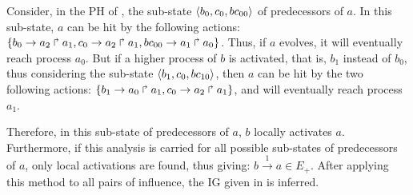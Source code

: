\begin{example*}
Consider, in the PH of , the sub-state $\langle b_0, c_0, bc_{00} \rangle$ of predecessors of $a$.
In this sub-state, $a$ can be hit by the following actions: $\{b_0\rightarrow a_2\Rsh a_1, c_0\rightarrow a_2\Rsh a_1, bc_{00}\rightarrow a_1\Rsh a_0\}$.
Thus, if $a$ evolves, it will eventually reach process $a_0$.
But if a higher process of $b$ is activated, that is, $b_1$ instead of $b_0$, thus considering the sub-state $\langle b_1, c_0, bc_{10} \rangle$,
then $a$ can be hit by the two following actions: $\{b_1\rightarrow a_0\Rsh a_1, c_0\rightarrow a_2\Rsh a_1\}$,
and will eventually reach process $a_1$.

Therefore, in this sub-state of predecessors of $a$, $b$ locally activates $a$.
Furthermore, if this analysis is carried for all possible sub-states of predecessors of $a$, only local activations are found,
thus giving: $b \xrightarrow{1} a \in E_+$.
After applying this method to all pairs of influence, the IG given in  is inferred.
\end{example*}
